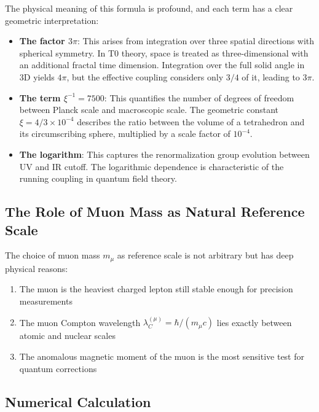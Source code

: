 \documentclass[12pt,a4paper]{article}
\theoremstyle{definition}
\begin{document}
	The physical meaning of this formula is profound, and each term has a clear geometric interpretation:
	
	\begin{itemize}
		\item \textbf{The factor $3\pi$}: This arises from integration over three spatial directions with spherical symmetry. In T0 theory, space is treated as three-dimensional with an additional fractal time dimension. Integration over the full solid angle in 3D yields $4\pi$, but the effective coupling considers only $3/4$ of it, leading to $3\pi$.
		
		\item \textbf{The term $\xi^{-1} = 7500$}: This quantifies the number of degrees of freedom between Planck scale and macroscopic scale. The geometric constant $\xi = 4/3 \times 10^{-4}$ describes the ratio between the volume of a tetrahedron and its circumscribing sphere, multiplied by a scale factor of $10^{-4}$.
		
		\item \textbf{The logarithm}: This captures the renormalization group evolution between UV and IR cutoff. The logarithmic dependence is characteristic of the running coupling in quantum field theory.
	\end{itemize}
	
	\subsection{The Role of Muon Mass as Natural Reference Scale}
	
	The choice of muon mass $m_{\mu}$ as reference scale is not arbitrary but has deep physical reasons:
	
	\begin{enumerate}
		\item The muon is the heaviest charged lepton still stable enough for precision measurements
		\item The muon Compton wavelength $\lambda_C^{(\mu)} = \hbar/(m_\mu c)$ lies exactly between atomic and nuclear scales
		\item The anomalous magnetic moment of the muon is the most sensitive test for quantum corrections
	\end{enumerate}
	
	\subsection{Numerical Calculation}
	
\end{document}
